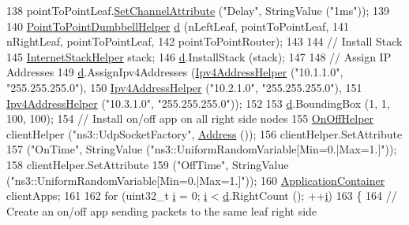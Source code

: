 \begin{DoxyCode}
138   pointToPointLeaf.\hyperlink{classns3_1_1PointToPointHelper_a6b5317fd17fb61e5a53f8d66a90b63b9}{SetChannelAttribute}   (\textcolor{stringliteral}{"Delay"}, StringValue (\textcolor{stringliteral}{"1ms"}));
139 
140   \hyperlink{classns3_1_1PointToPointDumbbellHelper}{PointToPointDumbbellHelper} \hyperlink{buildings__pathloss_8m_a9f9b934daed17a4d3613b6886ff4cf4b}{d} (nLeftLeaf, pointToPointLeaf,
141                                 nRightLeaf, pointToPointLeaf,
142                                 pointToPointRouter);
143 
144   \textcolor{comment}{// Install Stack}
145   \hyperlink{classns3_1_1InternetStackHelper}{InternetStackHelper} stack;
146   \hyperlink{buildings__pathloss_8m_a9f9b934daed17a4d3613b6886ff4cf4b}{d}.InstallStack (stack);
147 
148   \textcolor{comment}{// Assign IP Addresses}
149   \hyperlink{buildings__pathloss_8m_a9f9b934daed17a4d3613b6886ff4cf4b}{d}.AssignIpv4Addresses (\hyperlink{classns3_1_1Ipv4AddressHelper}{Ipv4AddressHelper} (\textcolor{stringliteral}{"10.1.1.0"}, \textcolor{stringliteral}{"255.255.255.0"}),
150                          \hyperlink{classns3_1_1Ipv4AddressHelper}{Ipv4AddressHelper} (\textcolor{stringliteral}{"10.2.1.0"}, \textcolor{stringliteral}{"255.255.255.0"}),
151                          \hyperlink{classns3_1_1Ipv4AddressHelper}{Ipv4AddressHelper} (\textcolor{stringliteral}{"10.3.1.0"}, \textcolor{stringliteral}{"255.255.255.0"}));
152 
153   \hyperlink{buildings__pathloss_8m_a9f9b934daed17a4d3613b6886ff4cf4b}{d}.BoundingBox (1, 1, 100, 100);
154   \textcolor{comment}{// Install on/off app on all right side nodes}
155   \hyperlink{classns3_1_1OnOffHelper}{OnOffHelper} clientHelper (\textcolor{stringliteral}{"ns3::UdpSocketFactory"}, \hyperlink{classns3_1_1Address}{Address} ());
156   clientHelper.SetAttribute 
157     (\textcolor{stringliteral}{"OnTime"}, StringValue (\textcolor{stringliteral}{"ns3::UniformRandomVariable[Min=0.|Max=1.]"}));
158   clientHelper.SetAttribute 
159     (\textcolor{stringliteral}{"OffTime"}, StringValue (\textcolor{stringliteral}{"ns3::UniformRandomVariable[Min=0.|Max=1.]"}));
160   \hyperlink{classns3_1_1ApplicationContainer}{ApplicationContainer} clientApps;
161 
162   \textcolor{keywordflow}{for} (uint32\_t \hyperlink{bernuolliDistribution_8m_a6f6ccfcf58b31cb6412107d9d5281426}{i} = 0; \hyperlink{bernuolliDistribution_8m_a6f6ccfcf58b31cb6412107d9d5281426}{i} < \hyperlink{buildings__pathloss_8m_a9f9b934daed17a4d3613b6886ff4cf4b}{d}.RightCount (); ++\hyperlink{bernuolliDistribution_8m_a6f6ccfcf58b31cb6412107d9d5281426}{i})
163     \{
164       \textcolor{comment}{// Create an on/off app sending packets to the same leaf right side}

\end{DoxyCode}

